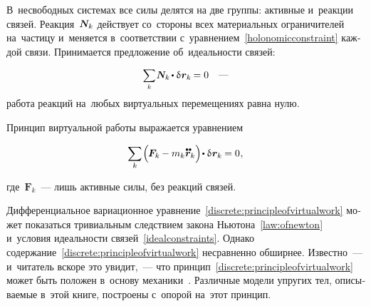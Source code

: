 \begin{otherlanguage}{russian}
В~несвободных системах все силы делятся на две группы: активные и~реакции связей. Реакция~$\mathboldN_k$ действует со~стороны всех материальных ограничителей на~частицу  и~меняется в~соответствии с~уравнением~\eqref{holonomicconstraint} каждой связи. Принимается предложение об~идеальности связей:

\nopagebreak\begin{equation}\label{idealconstraints}
\scalebox{0.9}{$\displaystyle \sum_k$} \hspace{.2ex} \mathboldN_k \hspace{-0.2ex} \dotp \variation{\hspace{.1ex}\bm{r}_k} \hspace{-0.16ex} = 0
\quad \textrm{---}
\vspace{-0.25em}\end{equation}
\noindent работа реакций на~любых виртуальных перемещениях равна нулю.

Принцип виртуальной работы выражается уравнением

\nopagebreak\vspace{-0.1em}\begin{equation}\label{discrete:principleofvirtualwork}
\displaystyle \sum_{\smash{k}} \hspace{-0.2ex} \left(^{\mathstrut} \hspace{-0.25ex} \bm{F}_k \hspace{-0.12ex} - m_k \mathdotdotabove{\bm{r}}_k \right) \hspace{-0.32ex} \dotp \variation{\hspace{.1ex}\bm{r}_k} \hspace{-0.1ex} = 0 \hspace{0.1ex},
\vspace{-0.32em}\end{equation}

\noindent где~${\bm{F}_k}$~--- лишь активные силы, без реакций связей.

Дифференциальное вариационное уравнение~\eqref{discrete:principleofvirtualwork} может показаться тривиальным следствием закона Ньютона~\eqref{law:ofnewton} и~условия идеальности связей~\eqref{idealconstraints}. Однако содержание~\eqref{discrete:principleofvirtualwork} несравненно обширнее. Известно~--- и~читатель вскоре это увидит,~--- что принцип~\eqref{discrete:principleofvirtualwork} может быть положен в~основу механики~\cite{gantmacher}. Различные модели упругих тел, описываемые в~этой книге, построены с~опорой на~этот принцип.


\end{otherlanguage}
